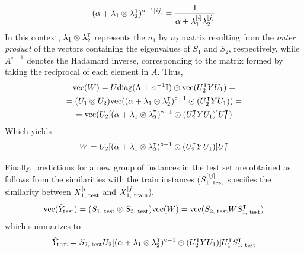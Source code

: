 %
\begin{equation}
    (\alpha + \mathbf{\lambda}_1 \otimes \mathbf{\lambda}_2^\intercal)^{\circ -1[ij]}
    = \frac{1}{\alpha + \mathbf{\lambda}_1^{[i]} \mathbf{\lambda}_2^{[j]}}
\end{equation}
%
In this context, $\mathbf{\lambda}_1 \otimes \mathbf{\lambda}_2^\intercal$ represents the $n_1$ by $n_2$ matrix resulting from the \emph{outer product} of the vectors containing the eigenvalues of $S_1$ and $S_2$, respectively, while $A^{\circ -1}$ denotes the Hadamard inverse, corresponding to the matrix formed by taking the reciprocal of each element in $A$. Thus,
%
\begin{multline*}
    \text{vec}(W)
    = U \text{diag}(\Lambda + \alpha^{-1}\mathbb{I}) \odot \text{vec}(U_2^\intercal Y U_1)
    =\\
    = (U_1 \otimes U_2) \text{vec}(
        (\alpha + \mathbf{\lambda}_1 \otimes \mathbf{\lambda}_2^\intercal)^{\circ -1}
        \odot (U_2^\intercal Y U_1)
    )
    =\\
    = \text{vec}(
        U_2
        [
            (\alpha + \mathbf{\lambda}_1 \otimes \mathbf{\lambda}_2^\intercal)^{\circ -1}
            \odot (U_2^\intercal Y U_1)
        ]
        U_1^\intercal
    )
\end{multline*}
%
Which yields
%
\begin{equation}
    W = 
        U_2
        [
            (\alpha + \mathbf{\lambda}_1 \otimes \mathbf{\lambda}_2^\intercal)^{\circ -1}
            \odot (U_2^\intercal Y U_1)
        ]
        U_1^\intercal
\end{equation}

Finally, predictions for a new group of instances in the test set are obtained as follows from the similarities with the train instances ($S_\text{1, test}^{[ij]}$ specifies the similarity between $X_\text{1, test}^{[i]}$ and $X_\text{1, train}^{[j]}$).
%
\begin{equation}
    \text{vec}(\hat Y_\text{test})
    = (S_\text{1, test} \otimes S_\text{2, test}) \text{vec}(W)
    = \text{vec}(S_\text{2, test} W S_\text{1, test}^\intercal)
\end{equation}
%
which summarizes to
%
\begin{equation}
    \hat Y_\text{test} =
        S_\text{2, test}
        U_2
        [
            (\alpha + \mathbf{\lambda}_1 \otimes \mathbf{\lambda}_2^\intercal)^{\circ -1}
            \odot (U_2^\intercal Y U_1)
        ]
        U_1^\intercal
        S_\text{1, test}^\intercal
\end{equation}


